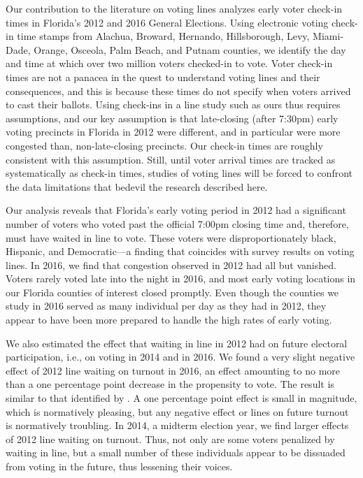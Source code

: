 \documentclass[12pt,titlepage]{article}
\begin{document}


Our contribution to the literature on voting lines analyzes early
voter check-in times in Florida's 2012 and 2016 General Elections.
Using electronic voting check-in time stamps from Alachua, Broward,
Hernando, Hillsborough, Levy, Miami-Dade, Orange, Osceola, Palm Beach,
and Putnam counties, we identify the day and time at which over two
million voters checked-in to vote.  Voter check-in times are not a
panacea in the quest to understand voting lines and their
consequences, and this is because these times do not specify when
voters arrived to cast their ballots. Using check-ins in a line study
such as ours thus requires assumptions, and our key assumption is that
late-closing (after 7:30pm) early voting precincts in Florida in 2012
were different, and in particular were more congested than,
non-late-closing precincts. Our check-in times are roughly consistent
with this assumption. Still, until voter arrival times are tracked as
systematically as check-in times, studies of voting lines will be
forced to confront the data limitations that bedevil the research
described here.

Our analysis reveals that Florida's early voting period in 2012 had a
significant number of voters who voted past the official 7:00pm
closing time and, therefore, must have waited in line to vote.  These
voters were disproportionately black, Hispanic, and Democratic---a
finding that coincides with survey results on voting lines.  In 2016,
we find that congestion observed in 2012 had all but vanished.  Voters
rarely voted late into the night in 2016, and most early voting
locations in our Florida counties of interest closed promptly.  Even
though the counties we study in 2016 served as many individual per day
as they had in 2012, they appear to have been more prepared to handle
the high rates of early voting.
  
We also estimated the effect that waiting in line in 2012 had on future
electoral participation, i.e., on voting in 2014 and in 2016.  We
found a very slight negative effect of 2012 line waiting on turnout in
2016, an effect amounting to no more than a one percentage point
decrease in the propensity to vote. The result is similar to that
identified by \citet{pettigrew:racegapwaittimes}.  A one percentage
point effect is small in magnitude, which is normatively pleasing, but
any negative effect or lines on future turnout is normatively
troubling.  In 2014, a midterm election year, we find larger effects
of 2012 line waiting on turnout.  Thus, not only are some voters
penalized by waiting in line, but a small number of these individuals
appear to be dissuaded from voting in the future, thus lessening their
voices.
\end{document}
